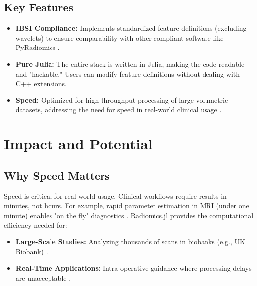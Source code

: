 \documentclass[preprint,12pt]{elsarticle}
\begin{document}
\subsection{Key Features}

\begin{itemize}
    \item \textbf{IBSI Compliance:} Implements standardized feature definitions (excluding wavelets) to ensure comparability with other compliant software like PyRadiomics \cite{BettinelliBranchini2020}.
    \item \textbf{Pure Julia:} The entire stack is written in Julia, making the code readable and "hackable." Users can modify feature definitions without dealing with C++ extensions.
    \item \textbf{Speed:} Optimized for high-throughput processing of large volumetric datasets, addressing the need for speed in real-world clinical usage \cite{SiscoWang2021}.
\end{itemize}

\section{Impact and Potential}

\subsection{Why Speed Matters}
Speed is critical for real-world usage. Clinical workflows require results in minutes, not hours. For example, rapid parameter estimation in MRI (under one minute) enables "on the fly" diagnostics \cite{SiscoWang2021}. Radiomics.jl provides the computational efficiency needed for:
\begin{itemize}
    \item \textbf{Large-Scale Studies:} Analyzing thousands of scans in biobanks (e.g., UK Biobank) \cite{FauconSamaroo2022}.
    \item \textbf{Real-Time Applications:} Intra-operative guidance where processing delays are unacceptable \cite{ReinertsenCollins2021}.
\end{itemize}
\end{document}

